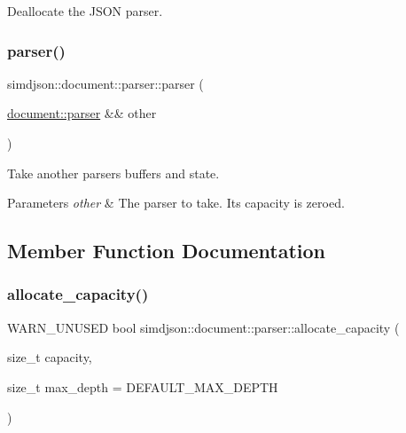 Deallocate the J\+S\+ON parser. 

\mbox{\label{classsimdjson_1_1document_1_1parser_a1996defcd55a2bded7e01308fd21ae87}} 
\subsubsection{\texorpdfstring{parser()}{parser()}\hspace{0.1cm}{\footnotesize\ttfamily [2/2]}}
{\footnotesize\ttfamily simdjson\+::document\+::parser\+::parser (\begin{DoxyParamCaption}\item[{\hyperlink{classsimdjson_1_1document_1_1parser}{document\+::parser} \&\&}]{other }\end{DoxyParamCaption})\hspace{0.3cm}{\ttfamily [default]}}



Take another parser\textquotesingle{}s buffers and state. 


\begin{DoxyParams}{Parameters}
{\em other} & The parser to take. Its capacity is zeroed. \\
\hline
\end{DoxyParams}


\subsection{Member Function Documentation}
\mbox{\label{classsimdjson_1_1document_1_1parser_af1e347c307036b644ed92f8bb575c4e9}} 
\subsubsection{\texorpdfstring{allocate\+\_\+capacity()}{allocate\_capacity()}}
{\footnotesize\ttfamily W\+A\+R\+N\+\_\+\+U\+N\+U\+S\+ED bool simdjson\+::document\+::parser\+::allocate\+\_\+capacity (\begin{DoxyParamCaption}\item[{size\+\_\+t}]{capacity,  }\item[{size\+\_\+t}]{max\+\_\+depth = {\ttfamily DEFAULT\+\_\+MAX\+\_\+DEPTH} }\end{DoxyParamCaption})\hspace{0.3cm}{\ttfamily [inline]}}



